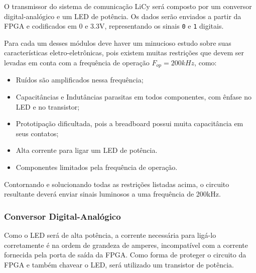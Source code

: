	O transmissor do sistema de comunicação LiCy será composto por um conversor digital-analógico e um LED de potência. Os dados serão enviados a partir da FPGA e codificados em 0 e 3.3V, representando os sinais \texttt{0} e \texttt{1} digitais. 
	
	Para cada um desses módulos deve haver um minucioso estudo sobre suas características eletro-eletrônicas, pois existem muitas restrições que devem ser levadas em conta com a frequência de operação $F_{op} = 200 kHz$, como:
	
	\begin{itemize}  
		\item Ruídos são amplificados nessa frequência;
		\item Capacitâncias e Indutâncias parasitas em todos componentes, com ênfase no LED e no transistor;
		\item Prototipação dificultada, pois a breadboard possui muita capacitância em seus contatos;
		\item Alta corrente para ligar um LED de potência.
		\item Componentes limitados pela frequência de operação.
	\end{itemize}
	
	Contornando e solucionando todas as restrições listadas acima, o circuito resultante deverá enviar sinais luminosos a uma frequência de 200kHz.

	
	\subsubsection{Conversor Digital-Analógico}
	Como o LED será de alta potência, a corrente necessária para ligá-lo corretamente é na ordem de grandeza de amperes, incompatível com a corrente fornecida pela porta de saída da FPGA. Como forma de proteger o circuito da FPGA e também chavear o LED, será utilizado um transistor de potência.
		
